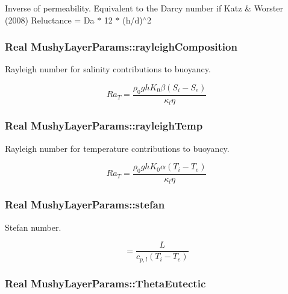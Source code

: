 Inverse of permeability. Equivalent to the Darcy number if Katz \& Worster (2008) Reluctance = Da $\ast$ 12 $\ast$ (h/d)$^\wedge$2 \hypertarget{class_mushy_layer_params_a7caaf9bff2bf7525386717144ecb7118}{
\subsubsection[{rayleigh\-Composition}]{\setlength{\rightskip}{0pt plus 5cm}Real Mushy\-Layer\-Params\-::rayleigh\-Composition}}\label{class_mushy_layer_params_a7caaf9bff2bf7525386717144ecb7118}


Rayleigh number for salinity contributions to buoyancy. 

\[ Ra_T = \frac{\rho_0 g h K_0 \beta (S_i - S_e)}{\kappa_l \eta} \] \hypertarget{class_mushy_layer_params_ada4f0f588513e96f72dcb1ba35a2585f}{
\subsubsection[{rayleigh\-Temp}]{\setlength{\rightskip}{0pt plus 5cm}Real Mushy\-Layer\-Params\-::rayleigh\-Temp}}\label{class_mushy_layer_params_ada4f0f588513e96f72dcb1ba35a2585f}


Rayleigh number for temperature contributions to buoyancy. 

\[ Ra_T = \frac{\rho_0 g h K_0 \alpha (T_i - T_e)}{\kappa_l \eta} \] \hypertarget{class_mushy_layer_params_ae226ddaa8dc0171b6fcb1e5393ef61a4}{
\subsubsection[{stefan}]{\setlength{\rightskip}{0pt plus 5cm}Real Mushy\-Layer\-Params\-::stefan}}\label{class_mushy_layer_params_ae226ddaa8dc0171b6fcb1e5393ef61a4}


Stefan number. 

\[ = \frac{L}{c_{p,l} (T_i - T_e)} \] \hypertarget{class_mushy_layer_params_add018c55cd0f09f969e3fa03872c6cf3}{
\subsubsection[{Theta\-Eutectic}]{\setlength{\rightskip}{0pt plus 5cm}Real Mushy\-Layer\-Params\-::\-Theta\-Eutectic}}\label{class_mushy_layer_params_add018c55cd0f09f969e3fa03872c6cf3}



